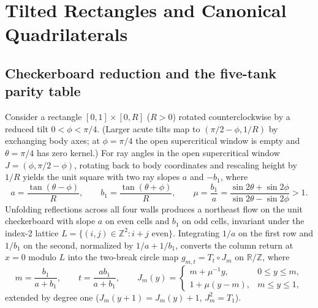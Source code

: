 \documentclass[11pt,reqno]{amsart}
\theoremstyle{definition}
\theoremstyle{remark}
\newcommand{\R}{\mathbb{R}}
\newcommand{\Z}{\mathbb{Z}}
\begin{document}
\section{Tilted Rectangles and Canonical Quadrilaterals}\label{sec:tilted}

\subsection{Checkerboard reduction and the five-tank parity table}
Consider a rectangle $[0,1]\times[0,R]$ ($R > 0$) rotated counterclockwise by a reduced tilt $0 < \phi < \pi/4$. (Larger acute tilts map to $(\pi/2 - \phi, 1/R)$ by exchanging body axes; at $\phi = \pi/4$ the open supercritical window is empty and $\theta = \pi/4$ has zero kernel.) For ray angles in the open supercritical window $J = (\phi, \pi/2 - \phi)$, rotating back to body coordinates and rescaling height by $1/R$ yields the unit square with two ray slopes $a$ and $-b_1$, where
\begin{equation}\label{eq:rect-slopes}
  a = \frac{\tan(\theta-\phi)}{R}, \qquad b_1 = \frac{\tan(\theta+\phi)}{R}, \qquad
  \mu = \frac{b_1}{a} = \frac{\sin 2\theta + \sin 2\phi}{\sin 2\theta - \sin 2\phi} > 1.
\end{equation}
Unfolding reflections across all four walls produces a northeast flow on the unit checkerboard with slope $a$ on even cells and $b_1$ on odd cells, invariant under the index-$2$ lattice $L = \{(i,j)\in\Z^2 : i+j\text{ even}\}$. Integrating $1/a$ on the first row and $1/b_1$ on the second, normalized by $1/a + 1/b_1$, converts the column return at $x=0$ modulo $L$ into the two-break circle map $g_{m,t} = T_t \circ J_m$ on $\R/\Z$, where
\begin{equation}\label{eq:two-break}
  m = \frac{b_1}{a + b_1}, \qquad t = \frac{a b_1}{a + b_1}, \qquad
  J_m(y) =
  \begin{cases}
    m + \mu^{-1} y, & 0 \le y \le m, \\
    1 + \mu(y - m), & m \le y \le 1,
  \end{cases}
\end{equation}
extended by degree one ($J_m(y+1) = J_m(y)+1$, $J_m^2 = T_1$).
\end{document}
